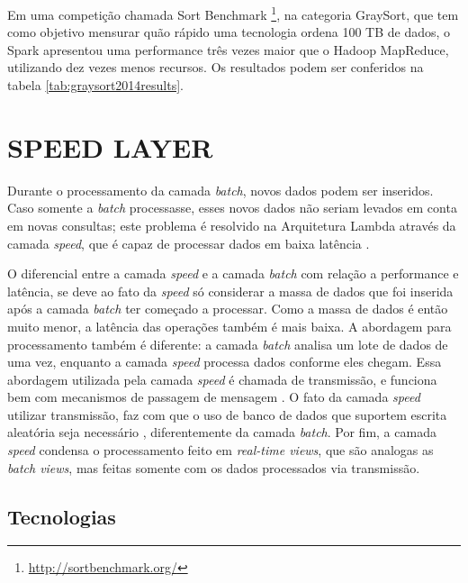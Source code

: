 Em uma competição chamada Sort
Benchmark \footnote{\url{http://sortbenchmark.org/}}, na categoria GraySort,
que tem como objetivo mensurar quão rápido uma tecnologia ordena 100 TB de
dados, o Spark apresentou uma performance três vezes maior que o Hadoop
MapReduce, utilizando dez vezes menos recursos. Os resultados podem ser
conferidos na tabela \ref{tab:graysort2014results}.

\section{SPEED LAYER}

Durante o processamento da camada \textit{batch}, novos dados podem ser
inseridos. Caso somente a \textit{batch} processasse, esses novos dados não
seriam levados em conta em novas consultas; este problema é resolvido
na Arquitetura Lambda através da camada \textit{speed}, que é capaz de
processar dados em baixa latência \cite{marz2015}.

O diferencial entre a camada \textit{speed} e a camada \textit{batch} com
relação a performance e latência, se deve ao fato da \textit{speed} só
considerar a massa de dados que foi inserida após a camada \textit{batch}
ter começado a processar. Como a massa de dados é então muito menor, a
latência das operações também é mais baixa. A abordagem para processamento
também é diferente: a camada \textit{batch} analisa um lote de dados de uma
vez, enquanto a camada \textit{speed} processa dados conforme eles chegam.
Essa abordagem utilizada pela camada \textit{speed} é chamada de transmissão,
e funciona bem com mecanismos de passagem de mensagem \cite{marz2015}.
O fato da camada \textit{speed} utilizar transmissão, faz com que o uso de
banco de dados que suportem escrita aleatória seja necessário \cite{marz2015},
diferentemente da camada \textit{batch}. Por fim, a camada \textit{speed}
condensa o processamento feito em \textit{real-time views}, que são analogas
as \textit{batch views}, mas feitas somente com os dados processados via
transmissão.



\subsection{Tecnologias}

